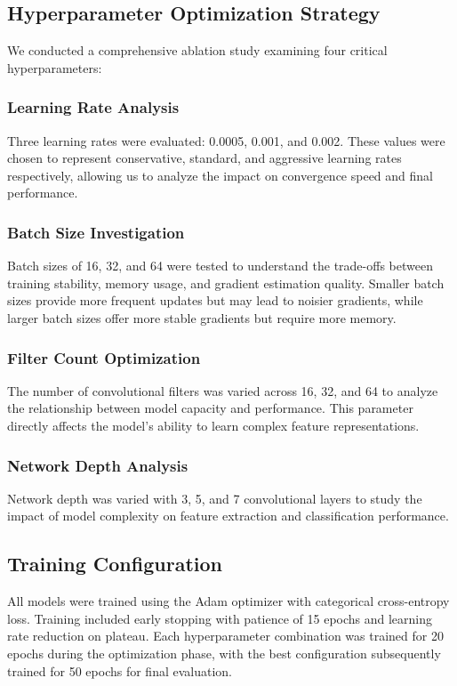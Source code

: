 \documentclass[norunningheads]{llncs}
\begin{document}
\subsection{Hyperparameter Optimization Strategy}

We conducted a comprehensive ablation study examining four critical hyperparameters:

\subsubsection{Learning Rate Analysis}
Three learning rates were evaluated: 0.0005, 0.001, and 0.002. These values were chosen to represent conservative, standard, and aggressive learning rates respectively, allowing us to analyze the impact on convergence speed and final performance.

\subsubsection{Batch Size Investigation}
Batch sizes of 16, 32, and 64 were tested to understand the trade-offs between training stability, memory usage, and gradient estimation quality. Smaller batch sizes provide more frequent updates but may lead to noisier gradients, while larger batch sizes offer more stable gradients but require more memory.

\subsubsection{Filter Count Optimization}
The number of convolutional filters was varied across 16, 32, and 64 to analyze the relationship between model capacity and performance. This parameter directly affects the model's ability to learn complex feature representations.

\subsubsection{Network Depth Analysis}
Network depth was varied with 3, 5, and 7 convolutional layers to study the impact of model complexity on feature extraction and classification performance.

\subsection{Training Configuration}

All models were trained using the Adam optimizer with categorical cross-entropy loss. Training included early stopping with patience of 15 epochs and learning rate reduction on plateau. Each hyperparameter combination was trained for 20 epochs during the optimization phase, with the best configuration subsequently trained for 50 epochs for final evaluation.
\end{document}
